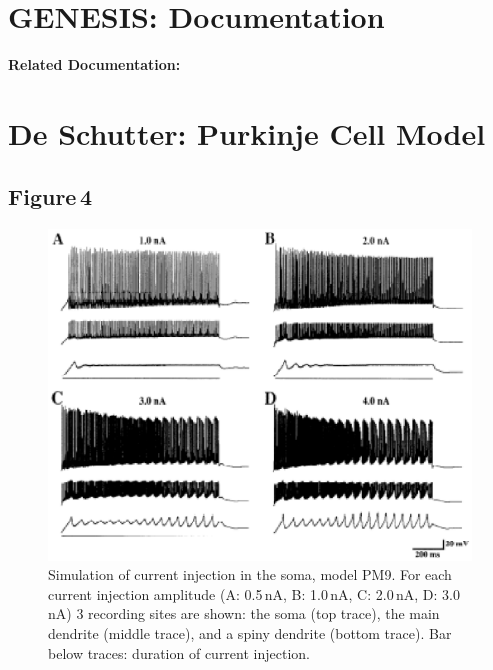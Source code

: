 \documentclass[12pt]{article}
\begin{document}
\section*{GENESIS: Documentation}

{\bf Related Documentation:}

\section*{De Schutter: Purkinje Cell Model}

\subsection*{Figure\,4}

\begin{figure}[h]
\centering
   \includegraphics[scale=1]{figures/Fig.1.4.eps}
   \caption{Simulation of current injection in the
soma, model PM9. For each current injection amplitude
(A: 0.5\,nA, B: 1.0\,nA, C: 2.0\,nA, D: 3.0\,
nA) 3 recording sites are shown: the soma (top
trace), the main dendrite (middle trace), and a
spiny dendrite (bottom trace). Bar below traces: duration
of current injection.}
   \label{fig:DS1.4}
\end{figure}



\end{document}
